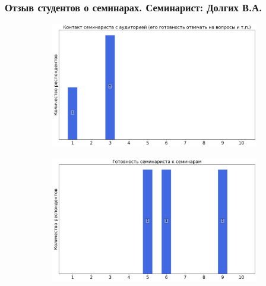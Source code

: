     \subsubsection{Отзыв студентов о семинарах. Семинарист: Долгих В.А.}
		\begin{figure}[H]
			\centering
			\begin{subfigure}[b]{0.45\textwidth}
				\centering
				\includegraphics[width=\textwidth]{images/2 course/Общая физика - электричество и магнетизм/seminarists-marks-Долгих В.А.-0.png}
			\end{subfigure}
			\begin{subfigure}[b]{0.45\textwidth}
				\centering
				\includegraphics[width=\textwidth]{images/2 course/Общая физика - электричество и магнетизм/seminarists-marks-Долгих В.А.-1.png}
			\end{subfigure}
			\begin{subfigure}[b]{0.45\textwidth}
				\centering

\end{subfigure}
\end{figure}
